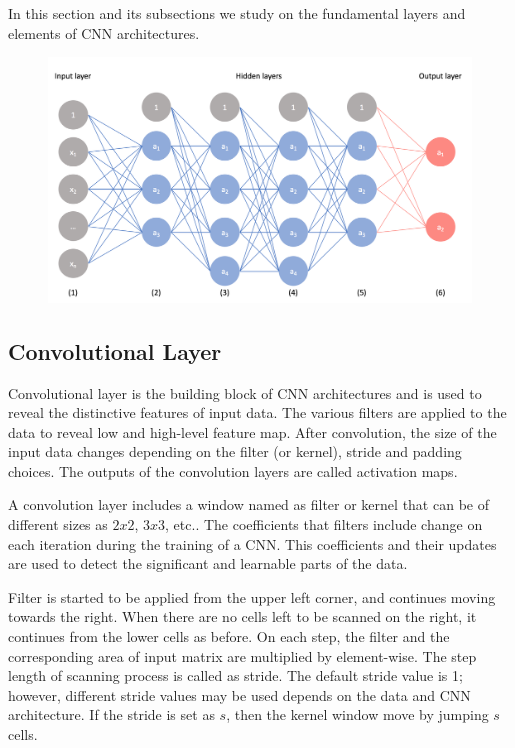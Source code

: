 In this section and its subsections we study on the fundamental layers and elements of CNN architectures. 

\begin{figure}[h]
	\centering
	\includegraphics[width=.8\linewidth]{fig/basic_cnn_sample.png}
	\vspace*{1mm}
	\label{basic_cnn_sample}
\end{figure}

\subsection{Convolutional Layer}

Convolutional layer is the building block of CNN architectures and is used to reveal the distinctive features of input data. The various filters are applied to the data to reveal low and high-level feature map. After convolution, the size of the input data changes depending on the filter (or kernel), stride and padding choices. The outputs of the convolution layers are called activation maps.

A convolution layer includes a window named as filter or kernel that can be of different sizes as $2x2$, $3x3$, etc.. The coefficients that filters include change on each iteration during the training of a CNN. This coefficients and their updates are used to detect the significant and learnable parts of the data.

Filter is started to be applied from the upper left corner, and continues moving towards the right. When there are no cells left to be scanned on the right, it continues from the lower cells as before. On each step, the filter and the corresponding area of input matrix are multiplied by element-wise. The step length of scanning process is called as stride. The default stride value is 1; however, different stride values may be used depends on the data and CNN architecture. If the stride is set as $s$, then the kernel window move by jumping $s$ cells.

